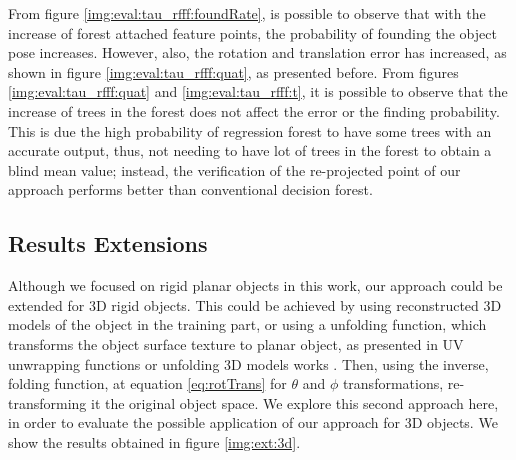 \documentclass[annual]{acmsiggraph}
\begin{document}
From figure \ref{img:eval:tau_rfff:foundRate}, is possible to observe that with the increase of forest attached feature points, the probability of founding the object pose increases. However, also, the rotation and translation error has increased, as shown in figure \ref{img:eval:tau_rfff:quat}, as presented before. From figures \ref{img:eval:tau_rfff:quat} and \ref{img:eval:tau_rfff:t}, it is possible to observe that the increase of trees in the forest does not affect the error or the finding probability. This is due the high probability of regression forest to have some trees with an accurate output, thus, not needing to have lot of trees in the forest to obtain a blind mean value; instead, the verification of the re-projected point of our approach performs better than conventional decision forest.   
  
     

\subsection{Results Extensions}
\label{subsec:results:other}




Although we focused on rigid planar objects in this work, our approach could be extended for 3D rigid objects. This could be achieved by using reconstructed 3D models \cite{Lepetit:2006} of the object in the training part, or using a unfolding function, which transforms the object surface texture to planar object, as presented in UV unwrapping functions \cite{Levy:2002} or unfolding 3D models works \cite{Mitani:2004}. Then, using the inverse, folding function, at equation \eqref{eq:rotTrans} for $\theta$ and $\phi$ transformations, re-transforming  it the original object space. We explore this second approach here, in order to evaluate the possible application of our approach for 3D objects. We show the results obtained in figure \ref{img:ext:3d}.
\end{document}
